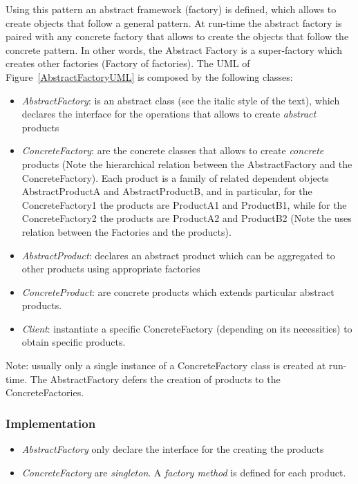\documentclass{article}
\begin{document}
Using this pattern an abstract framework (factory) is defined, which allows to create objects that follow a general pattern. At run-time the abstract factory is paired with any concrete factory that allows to create the objects that follow the concrete pattern. In other words, the Abstract Factory is a super-factory which creates other factories (Factory of factories). The UML of Figure~\ref{AbstractFactoryUML} is composed by the following classes:
\begin{itemize}
\item \emph{AbstractFactory}: is an abstract class (see the italic style of the text), which declares the interface for the operations that allows to create \emph{abstract} products
\item \emph{ConcreteFactory}: are the concrete classes that allows to create \emph{concrete} products (Note the hierarchical relation between the AbstractFactory and the ConcreteFactory). Each product is a family of related dependent objects AbstractProductA and AbstractProductB, and in particular, for the ConcreteFactory1 the products are ProductA1 and ProductB1, while for the ConcreteFactory2 the products are ProductA2 and ProductB2 (Note the uses relation between the Factories and the products).
\item \emph{AbstractProduct}:  declares an abstract product which can be aggregated to other products using appropriate factories
\item \emph{ConcreteProduct}: are  concrete products which extends  particular abstract products.
\item \emph{Client}: instantiate a specific ConcreteFactory (depending on its necessities) to obtain specific products.
\end{itemize}

Note: usually only a single instance of a ConcreteFactory class is created at run-time. The AbstractFactory defers the creation of products to the ConcreteFactories.

\subsubsection{Implementation}
\begin{itemize}
\item \emph{AbstractFactory} only declare the interface for the creating the products
\item \emph{ConcreteFactory} are \emph{singleton}. A \emph{factory method} is defined for each product. 
\end{itemize}
\end{document}
